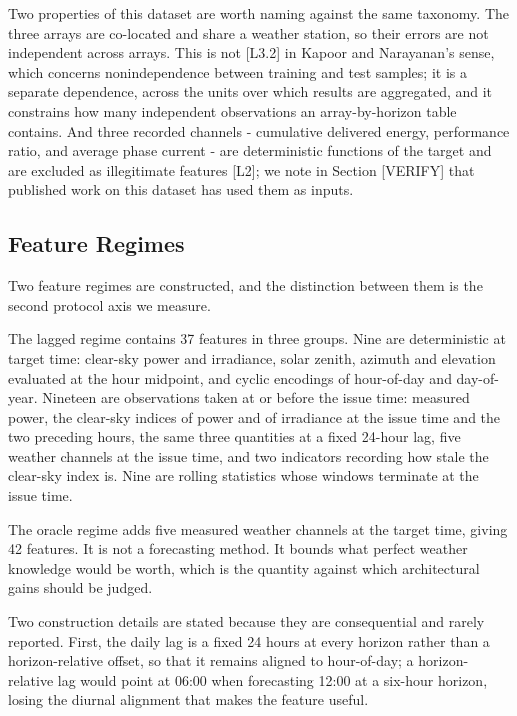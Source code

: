 Two properties of this dataset are worth naming against the same
taxonomy. The three arrays are co-located and share a weather station,
so their errors are not independent across arrays. This is not [L3.2]
in Kapoor and Narayanan's sense, which concerns nonindependence between
training and test samples; it is a separate dependence, across the
units over which results are aggregated, and it constrains how many
independent observations an array-by-horizon table contains. And three
recorded channels
- cumulative delivered energy, performance ratio, and average phase
current - are deterministic functions of the target and are excluded as
illegitimate features [L2]; we note in Section [VERIFY] that published
work on this dataset has used them as inputs.

\subsection{Feature Regimes}

Two feature regimes are constructed, and the distinction between them is
the second protocol axis we measure.

The lagged regime contains 37 features in three groups. Nine are
deterministic at target time: clear-sky power and irradiance, solar
zenith, azimuth and elevation evaluated at the hour midpoint, and cyclic
encodings of hour-of-day and day-of-year. Nineteen are observations
taken at or before the issue time: measured power, the clear-sky indices
of power and of irradiance at the issue time and the two preceding
hours, the same three quantities at a fixed 24-hour lag, five weather
channels at the issue time, and two indicators recording how stale the
clear-sky index is. Nine are rolling statistics whose windows terminate
at the issue time.

The oracle regime adds five measured weather channels at the target
time, giving 42 features. It is not a forecasting method. It bounds what
perfect weather knowledge would be worth, which is the quantity against
which architectural gains should be judged.



Two construction details are stated because they are consequential and
rarely reported. First, the daily lag is a fixed 24 hours at every
horizon rather than a horizon-relative offset, so that it remains
aligned to hour-of-day; a horizon-relative lag would point at 06:00 when
forecasting 12:00 at a six-hour horizon, losing the diurnal alignment
that makes the feature useful.

